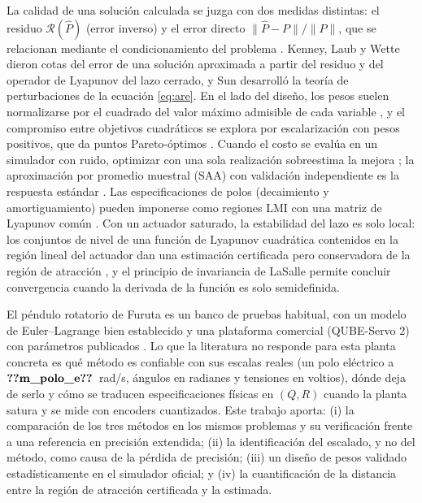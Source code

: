 \documentclass[11pt,a4paper]{article}
\begin{document}
La calidad de una solución calculada se juzga con dos medidas distintas: el residuo $\mathcal R(\hat P)$ (error
inverso) y el error directo $\|\hat P-P\|/\|P\|$, que se relacionan mediante el condicionamiento del problema
\cite{higham2002}. Kenney, Laub y Wette \cite{kenney1990} dieron cotas del error de una solución aproximada a
partir del residuo y del operador de Lyapunov del lazo cerrado, y Sun \cite{sun1998} desarrolló la teoría de
perturbaciones de la ecuación \eqref{eq:are}. En el lado del diseño, los pesos suelen normalizarse por el
cuadrado del valor máximo admisible de cada variable \cite{bryson2018}, y el compromiso entre objetivos
cuadráticos se explora por escalarización con pesos positivos, que da puntos Pareto-óptimos \cite{marler2004}.
Cuando el costo se evalúa en un simulador con ruido, optimizar con una sola realización sobreestima la mejora
\cite{smith2006}; la aproximación por promedio muestral (SAA) con validación independiente es la respuesta
estándar \cite{kleywegt2002}. Las especificaciones de polos (decaimiento y amortiguamiento) pueden imponerse
como regiones LMI con una matriz de Lyapunov común \cite{chilali1996,boyd1994}. Con un actuador saturado,
la estabilidad del lazo es solo local: los conjuntos de nivel de una función de Lyapunov cuadrática contenidos
en la región lineal del actuador dan una estimación certificada pero conservadora de la región de atracción
\cite{hu2001}, y el principio de invariancia de LaSalle \cite{lasalle1960} permite concluir convergencia cuando la
derivada de la función es solo semidefinida.

El péndulo rotatorio de Furuta \cite{furuta1992} es un banco de pruebas habitual, con un modelo de
Euler--Lagrange bien establecido \cite{cazzolato2011} y una plataforma comercial (QUBE-Servo 2) con parámetros
publicados \cite{quanser2016}. Lo que la literatura no responde para esta planta concreta es qué método es
confiable con sus escalas reales (un polo eléctrico a $\V{m_polo_e}$~rad/s, ángulos en radianes y tensiones en voltios),
dónde deja de serlo y cómo se traducen especificaciones físicas en $(Q,R)$ cuando la planta satura y se mide con
encoders cuantizados. Este trabajo aporta: (i) la comparación de los tres métodos en los mismos problemas y su
verificación frente a una referencia en precisión extendida; (ii) la identificación del escalado, y no del método,
como causa de la pérdida de precisión; (iii) un diseño de pesos validado estadísticamente en el simulador oficial;
y (iv) la cuantificación de la distancia entre la región de atracción certificada y la estimada.
\end{document}
